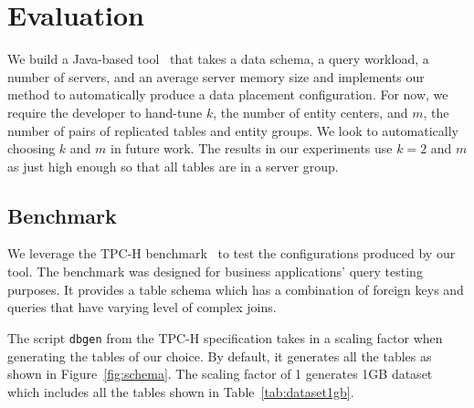 \section{Evaluation}
\label{sec:eval}
We build a Java-based tool~\cite{web:githublink} that takes a data schema, a query workload, a number of servers, and an average server memory size and implements our method to automatically produce a data placement configuration.  For now, we require the developer to hand-tune $k$, the number of entity centers, and $m$, the number of pairs of replicated tables and entity groups.  We look to automatically choosing $k$ and $m$ in future work. The results in our experiments use $k=2$ and $m$ as just high enough so that all tables are in a server group.  

\subsection{Benchmark}
\label{sec:benchmark}
We leverage the TPC-H benchmark~\cite{web:tpch} to test the configurations produced by our tool. The benchmark was designed for business applications' query testing purposes. It provides a table schema which has a combination of foreign keys and queries that have varying level of complex joins.

The script \texttt{dbgen} from the TPC-H specification takes in a scaling factor when generating the tables of our choice. By default, it generates all the tables as shown in Figure~\ref{fig:schema}. The scaling factor of 1 generates 1GB dataset which includes all the tables shown in Table~\ref{tab:dataset1gb}.

